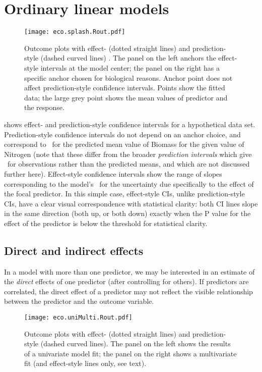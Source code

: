 
\section{Ordinary linear models}

\begin{figure}
\begin{center}
\texttt{[image: eco.splash.Rout.pdf]}
\end{center}
\caption{Outcome plots with effect- (dotted straight lines) and prediction-style (dashed curved lines) \CIs. The panel on the left anchors the effect-style intervals at the model center; the panel on the right has a specific anchor chosen for biological reasons. Anchor point does not affect prediction-style confidence intervals. Points show the fitted data; the large grey point shows the mean values of predictor and the response.}
\end{figure}

 shows effect- and prediction-style confidence intervals for a hypothetical data set. Prediction-style confidence intervals do not depend on an anchor choice, and correspond to \CIs\ for the predicted mean value of Biomass for the given value of Nitrogen (note that these differ from the broader \emph{prediction intervals} which give \CIs\ for observations rather than the predicted means, and which are not discussed further here). Effect-style confidence intervals show the range of slopes corresponding to the model's \CIs\ for the uncertainty due specifically to the effect of the focal predictor. In this simple case, effect-style CIs, unlike prediction-style CIs, have a clear visual correspondence with statistical clarity: both CI lines slope in the same direction (both up, or both down) exactly when the P value for the effect of the predictor is below the threshold for statistical clarity.

\subsection{Direct and indirect effects}

In a model with more than one predictor, we may be interested in an estimate of the \emph{direct} effects of one predictor (after controlling for others). If predictors are correlated, the direct effect of a predictor may not reflect the visible relationship between the predictor and the outcome variable.

\begin{figure}
\begin{center}
\texttt{[image: eco.uniMulti.Rout.pdf]}
\caption{Outcome plots with effect- (dotted straight lines) and prediction-style (dashed curved lines). The panel on the left shows the results of a univariate model fit; the panel on the right shows a multivariate fit (and effect-style lines only, see text).}
\end{center}
\end{figure}

